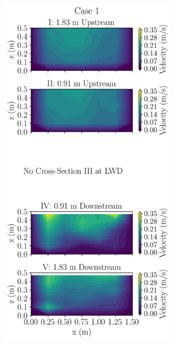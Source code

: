 \documentclass[preview, border=2pt]{standalone}
\begin{document}
\begin{figure}
     \centering
     \begin{subfigure}[b]{0.24\textwidth}
         \centering         
         \caption{}
         \includegraphics[width=\textwidth]{Case1_velocity_contours.png}         

\end{subfigure}
\end{figure}
\end{document}
